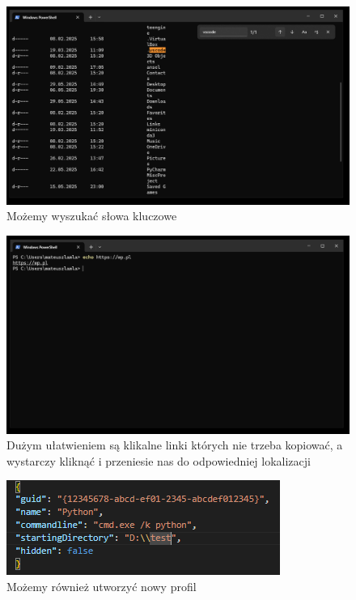 \documentclass[0.82pt,a4paper]{article}
\begin{document}
    \begin{figure}[H]
        \centering
        \includegraphics[width=0.8\linewidth]{media/Windows Terminal/5_wyszukiwarka.PNG}
        \caption[]{Możemy wyszukać słowa kluczowe}
        \label{fig:terminal_wyszukiwarka}
    \end{figure}

    \begin{figure}[H]
        \centering
        \includegraphics[width=0.8\linewidth]{media/Windows Terminal/6_klikalne_linki.PNG}
        \caption[]{Dużym ułatwieniem są klikalne linki których nie trzeba kopiować, a wystarczy kliknąć i przeniesie nas do odpowiedniej lokalizacji}
        \label{fig:terminal_klikalne_lnki}
    \end{figure}

    \begin{figure}[H]
        \centering
        \includegraphics[width=0.8\linewidth]{media/Windows Terminal/7_utworzenie_nowego_profilu_w_settings.png}
        \caption[]{Możemy również utworzyć nowy profil}
        \label{fig:terminal_nowy_profil}
    \end{figure}
\end{document}
